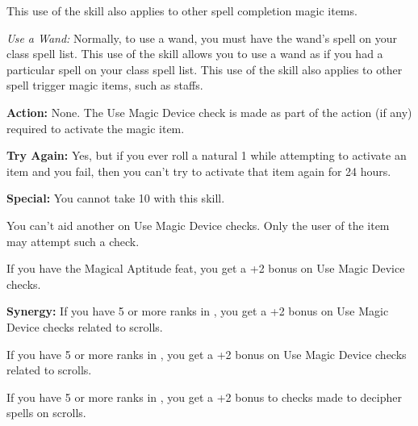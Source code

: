 This use of the skill also applies to other spell completion magic items.

\textit{Use a Wand:} Normally, to use a wand, you must have the wand’s spell on your class spell list. This use of the skill allows you to use a wand as if you had a particular spell on your class spell list. This use of the skill also applies to other spell trigger magic items, such as staffs.

\textbf{Action:} None. The Use Magic Device check is made as part of the action (if any) required to activate the magic item.

\textbf{Try Again:} Yes, but if you ever roll a natural 1 while attempting to activate an item and you fail, then you can’t try to activate that item again for 24 hours.

\textbf{Special:} You cannot take 10 with this skill.

You can’t aid another on Use Magic Device checks. Only the user of the item may attempt such a check.

If you have the Magical Aptitude feat, you get a +2 bonus on Use Magic Device checks.

\textbf{Synergy:} If you have 5 or more ranks in , you get a +2 bonus on Use Magic Device checks related to scrolls.

If you have 5 or more ranks in , you get a +2 bonus on Use Magic Device checks related to scrolls.

If you have 5 or more ranks in , you get a +2 bonus to  checks made to decipher spells on scrolls.

